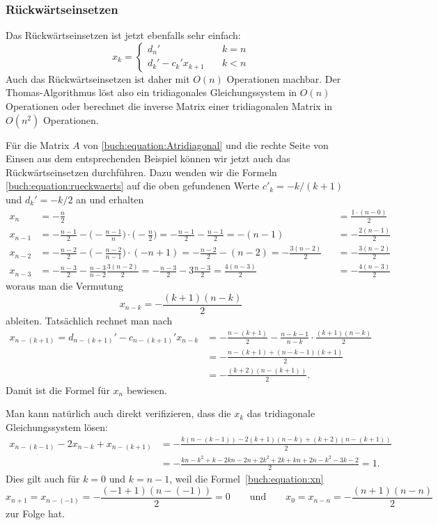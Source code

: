 \subsubsection{Rückwärtseinsetzen}
Das Rückwärtseinsetzen ist jetzt ebenfalls sehr einfach:
\begin{equation}
x_k = \begin{cases}
d_n'&\quad k=n
\\
d_k'  - c_k' x_{k+1} &\quad k < n
\end{cases}
\label{buch:equation:rueckwaerts}
\end{equation}
Auch das Rückwärtseinsetzen ist daher mit $O(n)$ Operationen machbar.
Der Thomas-Algorithmus löst also ein tridiagonales Gleichungssystem in
$O(n)$ Operationen oder berechnet die inverse Matrix einer 
tridiagonalen Matrix in $O(n^2)$ Operationen.

\begin{beispiel}
Für die Matrix $A$ von \eqref{buch:equation:Atridiagonal} und die rechte
Seite von Einsen aus dem entsprechenden Beispiel  können wir jetzt auch
das Rückwärtseinsetzen durchführen.
Dazu wenden wir die Formeln
\eqref{buch:equation:rueckwaerts}
auf die oben gefundenen Werte $c'_k=-k/(k+1)$ und $d_k'=-k/2$ an und
erhalten
\begin{align*}
x_n
&=
-\frac{n}{2}
&&=\frac{1\cdot (n-0)}2
\\
x_{n-1}
&=
-\frac{n-1}{2} -\biggl(-\frac{n-1}{n}\biggr)\cdot \biggl(-\frac{n}2\biggr)
=
-\frac{n-1}{2} - \frac{n-1}{2}
=
-(n-1)
&&=-\frac{2(n-1)}{2}
\\
x_{n-2}
&=
-\frac{n-2}{2} - \biggl(-\frac{n-2}{n-1}\biggr) \cdot (-n+1)
=
-\frac{n-2}{2} - (n-2)
=
-\frac{3(n-2)}2
&&=-\frac{3(n-2)}2
\\
x_{n-3}
&=
-\frac{n-3}{2} - \frac{n-3}{n-2} \frac{3(n-2)}2
=
-\frac{n-3}{2} - 3\frac{n-3}2
=
\frac{4(n-3)}2
&&=-\frac{4(n-3)}2
\end{align*}
woraus man die Vermutung
\begin{equation}
x_{n-k} = -\frac{(k+1)(n-k)}2
\label{buch:equation:xn}
\end{equation}
ableiten.
Tatsächlich rechnet man nach
\begin{align*}
x_{n-(k+1)}
=
d_{n-(k+1)}'-c_{n-(k+1)}'x_{n-k}
&=
-\frac{n-(k+1)}2-\frac{n-k-1}{n-k}\cdot \frac{(k+1)(n-k)}2
\\
&=
-\frac{n-(k+1)+(n-k-1)(k+1)}2
\\
&=
-\frac{(k+2)(n-(k+1))}2.
\end{align*}
Damit ist die Formel für $x_n$ bewiesen.

Man kann natürlich auch direkt verifizieren, dass die $x_k$ das tridiagonale
Gleichungssystem lösen:
\begin{align*}
x_{n-(k-1)}-2x_{n-k} + x_{n-(k+1)}
&=
-\frac{
k(n-(k-1))
-2(k+1)(n-k)
+(k+2)(n-(k+1))
}2
\\
&=
-\frac{
kn-k^2+k
-2kn-2n+2k^2+2k
+kn+2n-k^2-3k-2}2=1.
\end{align*}
Dies gilt auch für $k=0$  und $k=n-1$, weil die Formel~\eqref{buch:equation:xn}
\[
x_{n+1}=x_{n-(-1)} = -\frac{(-1+1)(n-(-1))}2=0
\qquad\text{und}\qquad
x_0 = x_{n-n} = -\frac{(n+1)(n-n)}2
\]
zur Folge hat.
\end{beispiel}

